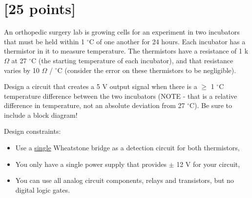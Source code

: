 

\section{[25 points]}

An orthopedic surgery lab is growing cells for an experiment in two incubators
that must be held within 1 $^\circ$C of one another for 24 hours.  Each
incubator has a thermistor in it to measure temperature.  The thermistors have a
resistance of 1 k$\Omega$ at 27 $^\circ$C (the starting temperature of each
incubator), and that resistance varies by 10 $\Omega$ / $^\circ$C (consider the
error on these thermistors to be negligible).

Design a circuit that creates a 5 V output signal when there is a $\geq$ 1
$^\circ$C temperature difference between the two incubators (NOTE - that is a
relative difference in temperature, not an absolute deviation from 27
$^\circ$C).  Be sure to include a block diagram!

Design constraints:
\begin{itemize}
    \item Use a \underline{single} Wheatstone bridge as a detection circuit for both thermistors,
    \item You only have a single power supply that provides $\pm$ 12 V for your circuit,
    \item You can use all analog circuit components, relays and transistors, but no digital logic gates.
\end{itemize}

\clearpage



\clearpage



\clearpage
